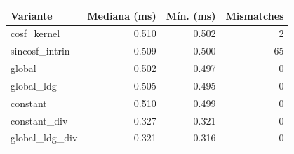 \begin{tabular}{lrrr}
\toprule
Variante & Mediana (ms) & Mín. (ms) & Mismatches \\
\midrule
cosf\_kernel & 0.510 & 0.502 & 2 \\
sincosf\_intrin & 0.509 & 0.500 & 65 \\
global & 0.502 & 0.497 & 0 \\
global\_ldg & 0.505 & 0.495 & 0 \\
constant & 0.510 & 0.499 & 0 \\
constant\_div & 0.327 & 0.321 & 0 \\
global\_ldg\_div & 0.321 & 0.316 & 0 \\
\bottomrule
\end{tabular}
